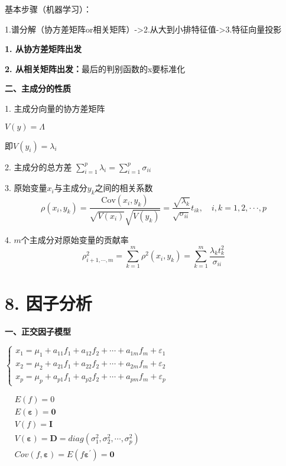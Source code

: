 \documentclass[10pt,a4paper]{ctexart} %
\begin{document}
\begin{multicols*}{3}
		基本步骤（机器学习）：
		
		1.谱分解（协方差矩阵or相关矩阵）->2.从大到小排特征值->3.特征向量投影
		
		\textbf{1. 从协方差矩阵出发}
		
		\textbf{2. 从相关矩阵出发：}最后的判别函数的x要标准化
		
		\textbf{二、主成分的性质}
		
		1. 主成分向量的协方差矩阵
		
		$V(y)=\Lambda$
		
		即$V(y_i)=\lambda_i$
		
		2. 主成分的总方差
		$\sum_{i=1}^p\lambda_i=\sum_{i=1}^p\sigma_{ii}$
		
		3. 原始变量$x_i$与主成分$y_k$之间的相关系数
		$$\rho(x_{i},y_{k})=\frac{\mathrm{Cov}(x_{i},y_{k})}{\sqrt{V(x_{i})}\sqrt{V(y_{k})}}=\frac{\sqrt{\lambda_{k}}}{\sqrt{\sigma_{ii}}}t_{ik},\quad i,k=1,2,\cdotp\cdotp\cdotp,p$$
		
		4. $m$个主成分对原始变量的贡献率
		$$\rho_{i+1,\cdots,m}^2=\sum_{k=1}^m\rho^2\left(x_i,y_k\right)=\sum_{k=1}^m\frac{\lambda_kt_k^2}{\sigma_{ii}}$$
		
		\section*{\centering \normalsize 8. 因子分析}
		
		\textbf{一、正交因子模型}
		
		$\begin{cases}x_1=\mu_1+a_{11}f_1+a_{12}f_2+\cdots+a_{1m}f_m+\varepsilon_1\\x_2=\mu_2+a_{21}f_1+a_{22}f_2+\cdots+a_{2m}f_m+\varepsilon_2\\x_p=\mu_p+a_{p1}f_1+a_{p2}f_2+\cdots+a_{pm}f_m+\varepsilon_p&\end{cases}$
		
		$\begin{aligned}&E\left(f\right)=0\\&E\left(\boldsymbol{\varepsilon}\right)=\boldsymbol{0}\\&V\left(f\right)=\boldsymbol{I}\\&V\left(\boldsymbol{\varepsilon}\right)=\boldsymbol{D}=diag\left(\sigma_{1}^{2},\sigma_{2}^{2},\cdots,\sigma_{p}^{2}\right)\\&Cov\left(f,\boldsymbol{\varepsilon}\right)=E\left(f\boldsymbol{\varepsilon}^{\prime}\right)=\boldsymbol{0}\end{aligned}$
		

\end{multicols*}
\end{document}
